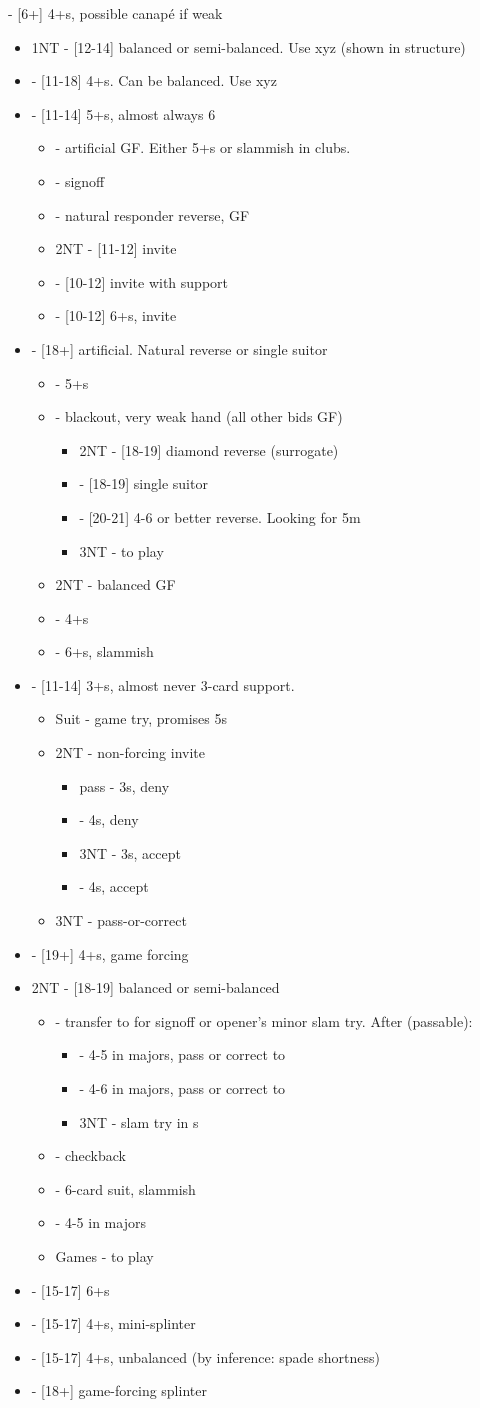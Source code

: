 \documentclass[12pt]{report}
\newcommand{\ul}[1]{\begin{itemize}#1\end{itemize}}
\newcommand{\li}{\item[~]}
\begin{document}
{        \li {} - [6+] 4+\he{}s, possible \di{} canapé if weak
        \ul {
            \li 1NT - [12-14] balanced or semi-balanced.  Use xyz (shown in \di1 structure)
            \li \sp1 - [11-18] 4+\sp{}s.  Can be balanced.  Use xyz
            \li \cl2 - [11-14] 5+\cl{}s, almost always 6
            \ul {
                \li \di2 - artificial GF.  Either 5+\he{}s or slammish in clubs.
                \li \he2 - signoff
                \li \sp2 - natural responder reverse, GF
                \li 2NT - [11-12] invite
                \li \cl3 - [10-12] invite with support
                \li \he3 - [10-12] 6+\he{}s, invite
            }
            \li \di2 - [18+] artificial.  Natural \di{} reverse or single suitor
            \ul {
                \li \he2 - 5+\he{}s
                \li \sp2 - blackout, very weak hand (all other bids GF)
                \ul {
                    \li 2NT - [18-19] diamond reverse (surrogate)
                    \li \cl3 - [18-19] single suitor
                    \li \di3 - [20-21] 4-6 or better reverse.  Looking for 5m
                    \li 3NT - to play
                }
                \li 2NT - balanced GF
                \li \cl3 - 4+\cl{}s
                \li \he3 - 6+\he{}s, slammish
            }
            \li \he2 - [11-14] 3+\he{}s, almost never 3-card support.
            \ul {
                \li Suit - game try, promises 5\he{}s
                \li 2NT - non-forcing invite
                \ul {
                    \li pass - 3\he{}s, deny
                    \li \he3 - 4\he{}s, deny
                    \li 3NT - 3\he{}s, accept
                    \li \he4 - 4\he{}s, accept
                }
                \li 3NT - pass-or-correct
            }
            \li \sp2 - [19+] 4+\sp{}s, game forcing
            \li 2NT - [18-19] balanced or semi-balanced
            \ul {
                \li \cl3 - transfer to \di{3} for signoff or opener's minor slam try.  After \di3 (passable):
                \ul {
                    \li \he3 - 4-5 in majors, pass or correct to \sp3
                    \li \sp3 - 4-6 in majors, pass or correct to \he4
                    \li 3NT - slam try in \cl{}s
                }
                \li \di3 - checkback
                \li \he3 - 6-card suit, slammish
                \li \sp3 - 4-5 in majors
                \li Games - to play
            }
            \li \cl3 - [15-17] 6+\cl{}s
            \li \di3 - [15-17] 4+\he{}s, mini-splinter
            \li \he3 - [15-17] 4+\he{}s, unbalanced (by inference: spade shortness)
            \li \sp3 - [18+] game-forcing splinter
}}
\end{document}
